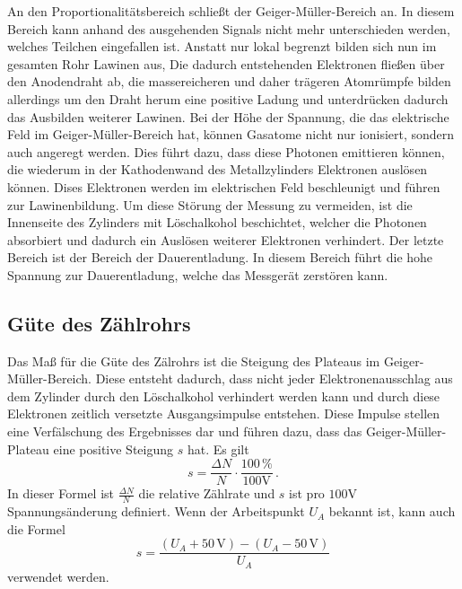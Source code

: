 An den Proportionalitätsbereich schließt der Geiger-Müller-Bereich an. In diesem Bereich 
kann anhand des ausgehenden Signals nicht mehr unterschieden werden, welches Teilchen 
eingefallen ist. Anstatt nur lokal begrenzt bilden sich nun im gesamten Rohr Lawinen aus, 
Die dadurch entstehenden Elektronen fließen über den Anodendraht ab, die massereicheren und daher 
trägeren Atomrümpfe bilden allerdings um den Draht herum eine positive Ladung und unterdrücken
dadurch das Ausbilden weiterer Lawinen. Bei der Höhe der Spannung, die das elektrische 
Feld im Geiger-Müller-Bereich hat, können Gasatome nicht nur ionisiert, sondern auch 
angeregt werden. Dies führt dazu, dass diese Photonen emittieren können, die wiederum in 
der Kathodenwand des Metallzylinders Elektronen auslösen können. Dises Elektronen werden
im elektrischen Feld beschleunigt und führen zur Lawinenbildung. Um diese Störung der
Messung zu vermeiden, ist die Innenseite des Zylinders mit Löschalkohol beschichtet, welcher
die Photonen absorbiert und dadurch ein Auslösen weiterer Elektronen verhindert. Der 
letzte Bereich ist der Bereich der Dauerentladung. In diesem Bereich führt die hohe Spannung
zur Dauerentladung, welche das Messgerät zerstören kann.  

\subsection{Güte des Zählrohrs}
Das Maß für die Güte des Zälrohrs ist die Steigung des Plateaus im Geiger-Müller-Bereich. 
Diese entsteht dadurch, dass nicht jeder Elektronenausschlag aus dem Zylinder durch den 
Löschalkohol verhindert werden kann und durch diese Elektronen zeitlich versetzte 
Ausgangsimpulse entstehen. Diese Impulse stellen eine Verfälschung des Ergebnisses dar und 
führen dazu, dass das Geiger-Müller-Plateau eine positive Steigung $s$ hat. Es gilt 
\begin{equation}
    s = \frac{\Delta N}{N} \cdot \frac{100 \,\%}{100 \unit{\volt}} \, .
    \label{eqn:s_anderes}
\end{equation}
In dieser Formel ist $\frac{\Delta N}{N}$ die relative Zählrate und $s$ ist pro 
$100 \unit{\volt}$ Spannungsänderung definiert. Wenn der Arbeitspunkt $U_A$ bekannt ist, 
kann auch die Formel 
\begin{equation}
    s = \frac{\left(U_A + 50 \, \unit{\volt}\right) - \left(U_A - 50 \, \unit{\volt} \right)}{U_A}
    \label{eqn:s_arbeitspunkt}
\end{equation}
verwendet werden.
